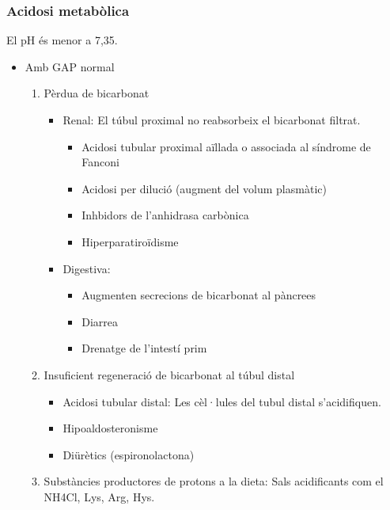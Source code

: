 \subsubsection{Acidosi metabòlica}
\label{sec:acidosi-metabolica}
El pH és menor a 7,35. 

\begin{itemize}
\item Amb GAP normal
  \begin{enumerate}
  \item Pèrdua de bicarbonat
    \begin{itemize}
    \item Renal: El túbul proximal no reabsorbeix el bicarbonat
      filtrat.
      \begin{itemize}
      \item Acidosi tubular proximal aïllada o associada al síndrome
        de Fanconi
      \item Acidosi per dilució (augment del volum plasmàtic)
      \item Inhbidors de l'anhidrasa carbònica
      \item Hiperparatiroïdisme 
      \end{itemize}
    \item Digestiva:
      \begin{itemize}
      \item Augmenten secrecions de bicarbonat al pàncrees
      \item Diarrea
      \item Drenatge de l'intestí prim
      \end{itemize}
    \end{itemize}
  \item Insuficient regeneració de bicarbonat al túbul distal
    \begin{itemize}
    \item Acidosi tubular distal: Les cèl·lules del tubul distal
      s'acidifiquen.
    \item Hipoaldosteronisme
    \item Diürètics (espironolactona)
    \end{itemize}
  \item Substàncies productores de protons a la dieta: Sals
    acidificants com el NH4Cl, Lys, Arg, Hys.
  \end{enumerate}


\end{itemize}
